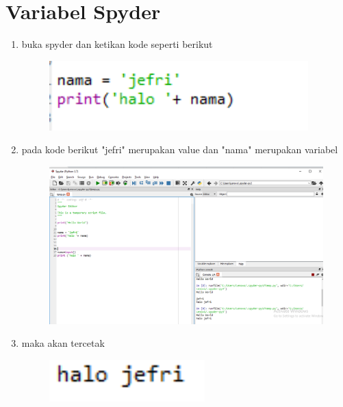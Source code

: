 \chapter*{Variabel Spyder}

\begin{enumerate}
   

\item buka spyder dan ketikan kode seperti berikut
	\begin{figure} [h]
	\includegraphics[width=10cm]{section/sp/sp5.png}
	\centering
	\end{figure}
	
	
\item pada kode berikut "jefri" merupakan value dan "nama" merupakan variabel
	\begin{figure} [h]
	\includegraphics[width=12cm]{section/sp/sp6.png}
	\centering
	\end{figure}
	
 \item maka akan tercetak 
 \begin{figure} [h]
	\includegraphics[width=6cm]{section/sp/sp7.png}
	\centering
	\end{figure}
 
	
	\end{enumerate}